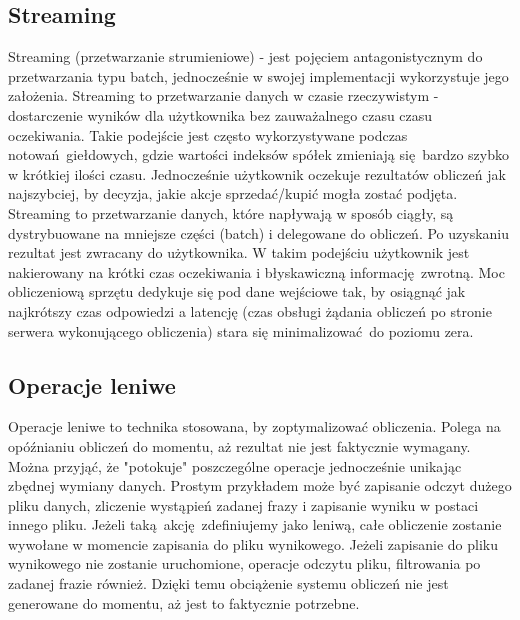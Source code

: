 \subsection{Streaming}\label{streaming_subsection}
Streaming (przetwarzanie strumieniowe) - jest pojęciem antagonistycznym do przetwarzania typu batch, jednocześnie w swojej implementacji wykorzystuje jego założenia. Streaming to przetwarzanie danych w czasie rzeczywistym - dostarczenie wyników dla użytkownika bez zauważalnego czasu czasu oczekiwania. Takie podejście jest często wykorzystywane podczas notowań giełdowych, gdzie wartości indeksów spółek zmieniają się bardzo szybko w krótkiej ilości czasu. Jednocześnie użytkownik oczekuje rezultatów obliczeń jak najszybciej, by decyzja, jakie akcje sprzedać/kupić mogła zostać podjęta. Streaming to przetwarzanie danych, które napływają w sposób ciągły, są dystrybuowane na mniejsze części (batch) i delegowane do obliczeń. Po uzyskaniu rezultat jest zwracany do użytkownika. W takim podejściu użytkownik jest nakierowany na krótki czas oczekiwania i błyskawiczną informację zwrotną. Moc obliczeniową sprzętu dedykuje się pod dane wejściowe tak, by osiągnąć jak najkrótszy czas odpowiedzi a latencję (czas obsługi żądania obliczeń po stronie serwera wykonującego obliczenia) stara się minimalizować do poziomu zera.
\subsection{Operacje leniwe}
Operacje leniwe to technika stosowana, by zoptymalizować obliczenia. Polega na opóźnianiu obliczeń do momentu, aż rezultat nie jest faktycznie wymagany. Można przyjąć, że "potokuje" poszczególne operacje jednocześnie unikając zbędnej wymiany danych. Prostym przykładem może być zapisanie odczyt dużego pliku danych, zliczenie wystąpień zadanej frazy i zapisanie wyniku w postaci innego pliku. Jeżeli taką akcję zdefiniujemy jako leniwą, całe obliczenie zostanie wywołane w momencie zapisania do pliku wynikowego. Jeżeli zapisanie do pliku wynikowego nie zostanie uruchomione, operacje odczytu pliku, filtrowania po zadanej frazie również. Dzięki temu obciążenie systemu obliczeń nie jest generowane do momentu, aż jest to faktycznie potrzebne.

